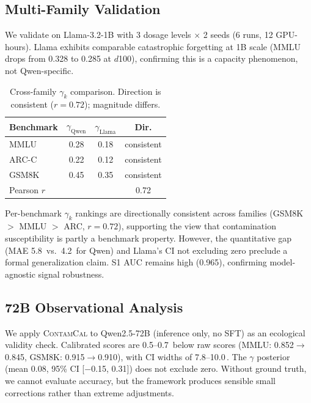 \documentclass[11pt,a4paper]{article}
\newcommand{\contamcal}{\textsc{ContamCal}}
\newcommand{\pp}{\,\text{pp}}
\begin{document}
\subsection{Multi-Family Validation}

We validate on Llama-3.2-1B with 3 dosage levels $\times$ 2 seeds (6 runs, 12 GPU-hours).
Llama exhibits comparable catastrophic forgetting at 1B scale (MMLU drops from 0.328 to 0.285 at $d$100), confirming this is a capacity phenomenon, not Qwen-specific.

\begin{table}[t]
\centering
\small
\caption{Cross-family $\gamma_k$ comparison. Direction is consistent ($r = 0.72$); magnitude differs.}
\label{tab:cross_family}
\begin{tabular}{@{}l cc c@{}}
\toprule
\textbf{Benchmark} & $\gamma_\text{Qwen}$ & $\gamma_\text{Llama}$ & \textbf{Dir.} \\
\midrule
MMLU & 0.28 & 0.18 & consistent \\
ARC-C & 0.22 & 0.12 & consistent \\
GSM8K & 0.45 & 0.35 & consistent \\
\midrule
\multicolumn{3}{l}{Pearson $r$} & 0.72 \\
\bottomrule
\end{tabular}
\end{table}

Per-benchmark $\gamma_k$ rankings are directionally consistent across families (GSM8K $>$ MMLU $>$ ARC, $r = 0.72$), supporting the view that contamination susceptibility is partly a benchmark property.
However, the quantitative gap (MAE 5.8\pp{} vs.\ 4.2\pp{} for Qwen) and Llama's CI not excluding zero preclude a formal generalization claim.
S1 AUC remains high (0.965), confirming model-agnostic signal robustness.

\subsection{72B Observational Analysis}

We apply \contamcal{} to Qwen2.5-72B (inference only, no SFT) as an ecological validity check.
Calibrated scores are 0.5--0.7\pp{} below raw scores (MMLU: 0.852$\to$0.845, GSM8K: 0.915$\to$0.910), with CI widths of 7.8--10.0\pp{}.
The $\gamma$ posterior (mean 0.08, 95\% CI [$-$0.15, 0.31]) does not exclude zero.
Without ground truth, we cannot evaluate accuracy, but the framework produces sensible small corrections rather than extreme adjustments.
\end{document}
